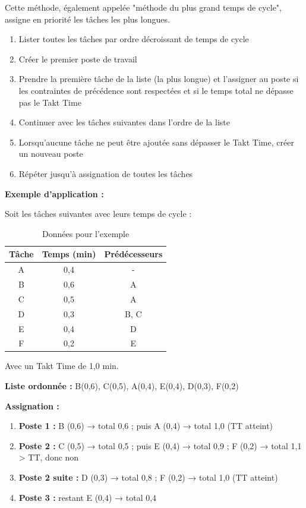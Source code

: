 \documentclass[12pt,a4paper]{article}
\newenvironment{methodbox}[1]
  {\begin{tcolorbox}[colback=blue!5!white, colframe=methodcolor, title=#1]\small}
  {\end{tcolorbox}}
\begin{document}
Cette méthode, également appelée "méthode du plus grand temps de cycle", assigne en priorité les tâches les plus longues.

\begin{methodbox}{Règle d'application}
\begin{enumerate}
    \item Lister toutes les tâches par ordre décroissant de temps de cycle
    \item Créer le premier poste de travail
    \item Prendre la première tâche de la liste (la plus longue) et l'assigner au poste si les contraintes de précédence sont respectées et si le temps total ne dépasse pas le Takt Time
    \item Continuer avec les tâches suivantes dans l'ordre de la liste
    \item Lorsqu'aucune tâche ne peut être ajoutée sans dépasser le Takt Time, créer un nouveau poste
    \item Répéter jusqu'à assignation de toutes les tâches
\end{enumerate}
\end{methodbox}

\textbf{Exemple d'application :}

Soit les tâches suivantes avec leurs temps de cycle :

\begin{table}[H]
\centering
\begin{tabular}{|c|c|c|}
\hline
\textbf{Tâche} & \textbf{Temps (min)} & \textbf{Prédécesseurs} \\
\hline
A & 0,4 & - \\
\hline
B & 0,6 & A \\
\hline
C & 0,5 & A \\
\hline
D & 0,3 & B, C \\
\hline
E & 0,4 & D \\
\hline
F & 0,2 & E \\
\hline
\end{tabular}
\caption{Données pour l'exemple}
\end{table}

Avec un Takt Time de 1,0 min.

\textbf{Liste ordonnée :} B(0,6), C(0,5), A(0,4), E(0,4), D(0,3), F(0,2)

\textbf{Assignation :}

\begin{enumerate}
    \item \textbf{Poste 1 :} B (0,6) → total 0,6 ; puis A (0,4) → total 1,0 (TT atteint)
    \item \textbf{Poste 2 :} C (0,5) → total 0,5 ; puis E (0,4) → total 0,9 ; F (0,2) → total 1,1 > TT, donc non
    \item \textbf{Poste 2 suite :} D (0,3) → total 0,8 ; F (0,2) → total 1,0 (TT atteint)
    \item \textbf{Poste 3 :} restant E (0,4) → total 0,4
\end{enumerate}
\end{document}
